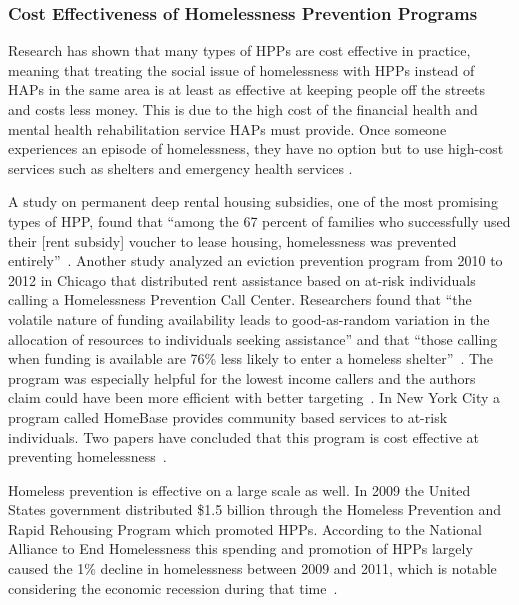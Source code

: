 \documentclass[10pt,letterpaper]{article}
\newcommand{\red}[1]{{\color{red}{#1}}}
\begin{document}
\subsubsection*{Cost Effectiveness of Homelessness Prevention Programs}
Research has shown that many types of HPPs are cost effective in practice, meaning that treating the social issue of homelessness with HPPs instead of HAPs in the same area is at least as effective at keeping people off the streets and costs less money. This is due to the high cost of the financial health and mental health rehabilitation service HAPs must provide. Once someone experiences an episode of homelessness, they have no option but to use high-cost services such as shelters and emergency health services \red{add source}.

A study on permanent deep rental housing subsidies, one of the most promising types of HPP, found that ``among the 67 percent of families who successfully used their [rent subsidy] voucher to lease housing, homelessness was prevented entirely''~\cite{shinn2019homelessness}. Another study analyzed an eviction prevention program from 2010 to 2012 in Chicago that distributed rent assistance based on at-risk individuals calling a Homelessness Prevention Call Center. Researchers found that ``the volatile nature of funding availability leads to good-as-random variation in the allocation of resources to individuals seeking assistance'' and that ``those calling when funding is available are 76\% less likely to enter a homeless shelter''~\cite{evans2016impact}. The program was especially helpful for the lowest income callers and the authors claim could have been more efficient with better targeting~\cite{evans2016impact}. In New York City a program called HomeBase provides community based services to at-risk individuals. Two papers have concluded that this program is cost effective at preventing homelessness~\cite{rolston2013evaluation, goodman2016homelessness}. 

Homeless prevention is effective on a large scale as well. In 2009 the United States government distributed \$1.5 billion through the Homeless Prevention and Rapid Rehousing Program which promoted HPPs. According to the National Alliance to End Homelessness this spending and promotion of HPPs largely caused the 1\% decline in homelessness between 2009 and 2011, which is notable considering the economic recession during that time~\cite{shinn2013efficient}.
\end{document}
